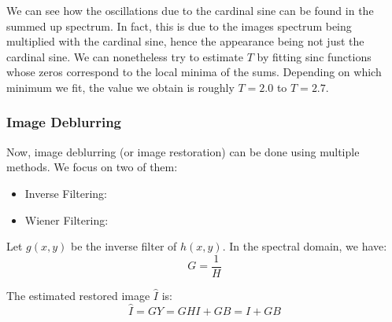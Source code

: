 We can see how the oscillations due to the cardinal sine can be found in the summed up spectrum. In fact, this is due to the images spectrum being multiplied with the cardinal sine, hence the appearance being not just the cardinal sine. We can nonetheless try to estimate $T$ by fitting sinc functions whose zeros correspond to the local minima of the sums. Depending on which minimum we fit, the value we obtain is roughly $T = 2.0$ to $T = 2.7$.


    
    



\subsubsection{Image Deblurring}

Now, image deblurring (or image restoration) can be done using multiple methods. We focus on two of them:
\begin{itemize}
    \item Inverse Filtering: 
    \item Wiener Filtering: 
\end{itemize}

Let $g(x, y)$ be the inverse filter of $h(x, y)$. In the spectral domain, we have:
\begin{equation}
    G = \frac{1}{H}
\end{equation}

The estimated restored image $\hat{I}$ is:
\begin{equation}
    \hat{I} = GY = GHI + GB = I + GB
\end{equation}

